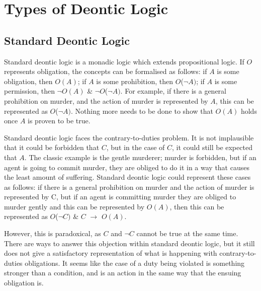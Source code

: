 \documentclass{l4proj}
\begin{document}

\section{Types of Deontic Logic}

\subsection{Standard Deontic Logic}
Standard deontic logic is a monadic logic which extends propositional logic. If $O$ represents obligation, the concepts can be formalised as follows: if $A$ is some obligation, then $O(A)$; if $A$ is some prohibition, then $O$(\( \neg \)$A)$; if $A$ is some permission, then \( \neg \)$O(A)$ \& \( \neg \)$O$(\( \neg \)$A)$. For example, if there is a general prohibition on murder, and the action of murder is represented by $A$, this can be represented as $O$(\( \neg \)$A)$. Nothing more needs to be done to show that $O(A)$ holds once $A$ is proven to be true. 

Standard deontic logic faces the contrary-to-duties problem. It is not implausible that it could be forbidden that $C$, but in the case of $C$, it could still be expected that $A$. The classic example is the gentle murderer; murder is forbidden, but if an agent is going to commit murder, they are obliged to do it in a way that causes the least amount of suffering. Standard deontic logic could represent these cases as follows: if there is a general prohibition on murder and the action of murder is represented by C, but if an agent is committing murder they are obliged to murder gently and this can be represented by $O(A)$, then this can be represented as $O$(\( \neg \)$C)$ \& $C$ \( \to \) $O(A)$. 

However, this is paradoxical, as $C$ and \( \neg \)$C$ cannot be true at the same time. There are ways to answer this objection within standard deontic logic, but it still does not give a satisfactory representation of what is happening with contrary-to-duties obligations. It seems like the case of a duty being violated is something stronger than a condition, and is an action in the same way that the ensuing obligation is. 
\end{document}
